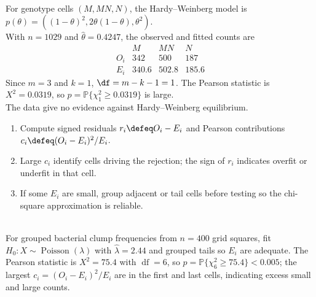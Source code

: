 \begin{example} \label{ex:hardy-weinberg-goodness-of-fit} \\
For genotype cells $(M,MN,N)$, the Hardy--Weinberg model is $p(\theta)=((1-\theta)^2,2\theta(1-\theta),\theta^2)$.\\
With $n=1029$ and $\widehat{\theta}=0.4247$, the observed and fitted counts are
\[
\begin{array}{c|ccc}
&M&MN&N\\ \hline
O_i&342&500&187\\
E_i&340.6&502.8&185.6
\end{array}
\]
Since $m=3$ and $k=1$, $\df=m-k-1=1$. The Pearson statistic is $X^2=0.0319$, so $p=\mathbb{P}\{\chi^2_1\geq0.0319\}$ is large.\\
The data give no evidence against Hardy--Weinberg equilibrium.
\end{example}

\begin{method} \label{meth:reading-goodness-of-fit-cells} 
\begin{enumerate}[label=(\roman*)]
\setlength{\itemsep}{0pt}
\item Compute signed residuals $r_i\defeq O_i-E_i$ and Pearson contributions $c_i\defeq(O_i-E_i)^2/E_i$.
\item Large $c_i$ identify cells driving the rejection; the sign of $r_i$ indicates overfit or underfit in that cell.
\item If some $E_i$ are small, group adjacent or tail cells before testing so the chi-square approximation is reliable.
\end{enumerate}
\end{method}

\begin{example} \label{ex:poisson-clumps-goodness-of-fit} \\
For grouped bacterial clump frequencies from $n=400$ grid squares, fit $H_0:X\sim\operatorname{Poisson}(\lambda)$ with $\widehat{\lambda}=2.44$ and grouped tails so $E_i$ are adequate.
The Pearson statistic is $X^2=75.4$ with $\operatorname{df}=6$, so $p=\mathbb{P}\{\chi^2_6\geq75.4\}<0.005$; the largest $c_i=(O_i-E_i)^2/E_i$ are in the first and last cells, indicating excess small and large counts.
\end{example}

